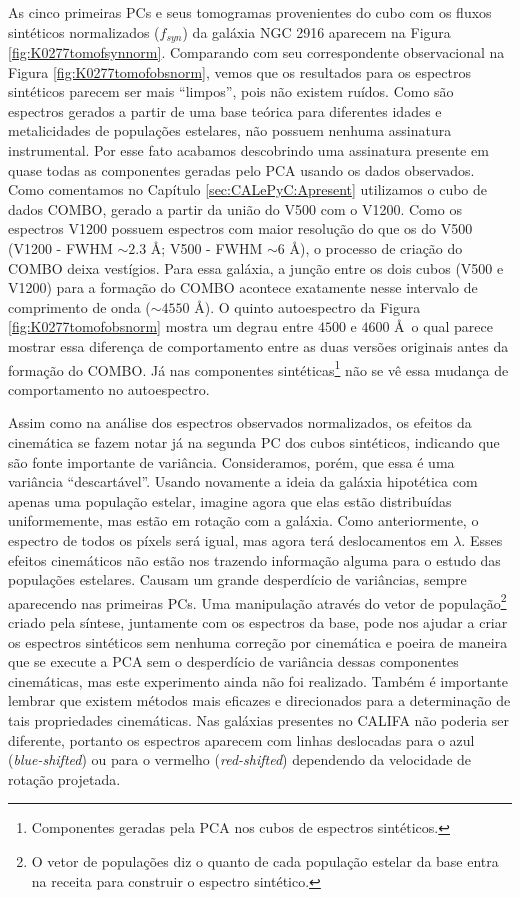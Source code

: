 As cinco primeiras PCs e seus tomogramas provenientes do cubo com os fluxos sintéticos normalizados ($f_{syn}$) da
galáxia NGC 2916 aparecem na Figura \ref{fig:K0277tomofsynnorm}. Comparando com seu correspondente observacional na Figura
\ref{fig:K0277tomofobsnorm}, vemos que os resultados para os espectros sintéticos parecem ser mais ``limpos'', pois não
existem ruídos. Como são espectros gerados a partir de uma base teórica para diferentes idades e metalicidades de
populações estelares, não possuem nenhuma assinatura instrumental. Por esse fato acabamos descobrindo uma assinatura
presente em quase todas as componentes geradas pelo PCA usando os dados observados. Como comentamos no Capítulo
\ref{sec:CALePyC:Apresent} utilizamos o cubo de dados COMBO, gerado a partir da união do V500 com o V1200. Como os
espectros V1200 possuem espectros com maior resolução do que os do V500 (V1200 - FWHM $\sim 2.3$ \AA; V500 - FWHM $\sim
6$ \AA), o processo de criação do COMBO deixa vestígios. Para essa galáxia, a junção entre os dois cubos (V500 e V1200)
para a formação do COMBO acontece exatamente nesse intervalo de comprimento de onda ($\sim 4550$ \AA). O quinto
autoespectro da Figura \ref{fig:K0277tomofobsnorm} mostra um degrau entre $4500$ e $4600$ \AA\ o qual parece mostrar
essa diferença de comportamento entre as duas versões originais antes da formação do COMBO. Já nas componentes
sintéticas\footnote{Componentes geradas pela PCA nos cubos de espectros sintéticos.} não se vê essa mudança de
comportamento no autoespectro.

Assim como na análise dos espectros observados normalizados, os efeitos da cinemática se fazem notar já na segunda PC
dos cubos sintéticos, indicando que são fonte importante de variância. Consideramos, porém, que essa é uma variância
``descartável''. Usando novamente a ideia da galáxia hipotética com apenas uma população estelar, imagine agora que elas
estão distribuídas uniformemente, mas estão em rotação com a galáxia. Como anteriormente, o espectro de todos os píxels
será igual, mas agora terá deslocamentos em $\lambda$. Esses efeitos cinemáticos não estão nos trazendo informação
alguma para o estudo das populações estelares. Causam um grande desperdício de variâncias, sempre aparecendo nas
primeiras PCs. Uma manipulação através do vetor de população\footnote{O vetor de populações diz o quanto de cada
população estelar da base entra na receita para construir o espectro sintético.} criado pela síntese, juntamente com os
espectros da base, pode nos ajudar a criar os espectros sintéticos sem nenhuma correção por cinemática e poeira de
maneira que se execute a PCA sem o desperdício de variância dessas componentes cinemáticas, mas este experimento ainda
não foi realizado. Também é importante lembrar que existem métodos mais eficazes e direcionados para a determinação de
tais propriedades cinemáticas. Nas galáxias presentes no CALIFA não poderia ser diferente, portanto os espectros
aparecem com linhas deslocadas para o azul ({\em blue-shifted}) ou para o vermelho ({\em red-shifted}) dependendo da
velocidade de rotação projetada. 

